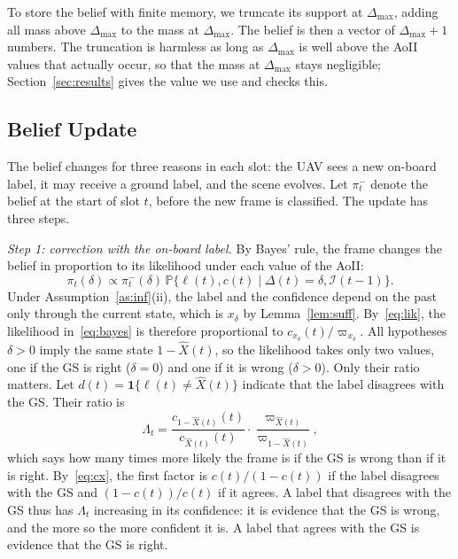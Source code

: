 \documentclass[journal]{IEEEtran}
\theoremstyle{remark}
\newcommand{\Prob}{\mathbb{P}}
\newcommand{\ind}[1]{\mathbf{1}\{#1\}}
\newcommand{\I}{\mathcal{I}}
\newcommand{\lab}{\ell}
\begin{document}
To store the belief with finite memory, we truncate its support at $\Delta_{\max}$, adding all mass above $\Delta_{\max}$ to the mass at $\Delta_{\max}$. The belief is then a vector of $\Delta_{\max}+1$ numbers. The truncation is harmless as long as $\Delta_{\max}$ is well above the AoII values that actually occur, so that the mass at $\Delta_{\max}$ stays negligible; Section~\ref{sec:results} gives the value we use and checks this.

\subsection{Belief Update}\label{sec:update}
The belief changes for three reasons in each slot: the UAV sees a new on-board label, it may receive a ground label, and the scene evolves. Let $\pi^-_t$ denote the belief at the start of slot $t$, before the new frame is classified. The update has three steps.

\emph{Step 1: correction with the on-board label.} By Bayes' rule, the frame changes the belief in proportion to its likelihood under each value of the AoII:
\begin{equation}\label{eq:bayes}
\pi_t(\delta)\propto\pi^-_t(\delta)\,\Prob\big\{\lab(t),c(t)\mid\Delta(t)=\delta,\I(t-1)\big\}.
\end{equation}
Under Assumption~\ref{as:inf}(ii), the label and the confidence depend on the past only through the current state, which is $x_\delta$ by Lemma~\ref{lem:suff}. By~\eqref{eq:lik}, the likelihood in~\eqref{eq:bayes} is therefore proportional to $c_{x_\delta}(t)/\varpi_{x_\delta}$. All hypotheses $\delta>0$ imply the same state $1-\hat X(t)$, so the likelihood takes only two values, one if the GS is right ($\delta=0$) and one if it is wrong ($\delta>0$). Only their ratio matters. Let $d(t)=\ind{\lab(t)\neq\hat X(t)}$ indicate that the label disagrees with the GS. Their ratio is
\begin{equation}\label{eq:Lambda}
\Lambda_t=\frac{c_{1-\hat X(t)}(t)}{c_{\hat X(t)}(t)}\cdot\frac{\varpi_{\hat X(t)}}{\varpi_{1-\hat X(t)}},
\end{equation}
which says how many times more likely the frame is if the GS is wrong than if it is right. By~\eqref{eq:cx}, the first factor is $c(t)/(1-c(t))$ if the label disagrees with the GS and $(1-c(t))/c(t)$ if it agrees. A label that disagrees with the GS thus has $\Lambda_t$ increasing in its confidence: it is evidence that the GS is wrong, and the more so the more confident it is. A label that agrees with the GS is evidence that the GS is right.
\end{document}
